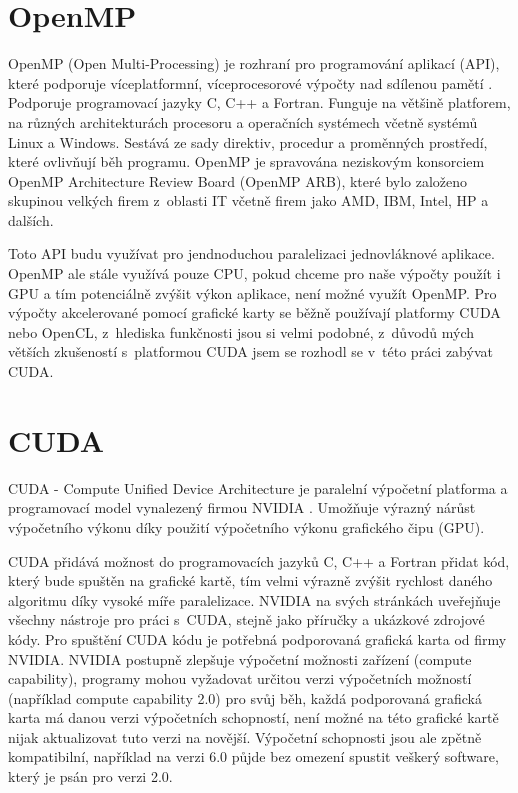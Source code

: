 \documentclass[thesis=M,czech]{FITthesis}[2016/06/26]
\begin{document}
\section{OpenMP}
OpenMP (Open Multi-Processing) je rozhraní pro programování aplikací (API), které podporuje víceplatformní, víceprocesorové výpočty nad sdílenou pamětí \cite{openmp}. Podporuje programovací jazyky C, C++ a Fortran. Funguje na většině platforem, na různých architekturách procesoru a operačních systémech včetně systémů Linux a Windows. Sestává ze sady direktiv, procedur a proměnných prostředí, které ovlivňují běh programu.
OpenMP je spravována neziskovým konsorciem OpenMP Architecture Review Board (OpenMP ARB), které bylo založeno skupinou velkých firem z~oblasti IT včetně firem jako AMD, IBM, Intel, HP a dalších.

Toto API budu využívat pro jendnoduchou paralelizaci jednovláknové aplikace. OpenMP ale stále využívá pouze CPU, pokud chceme pro naše výpočty použít i GPU a tím potenciálně zvýšit výkon aplikace, není možné využít OpenMP. Pro výpočty akcelerované pomocí grafické karty se běžně používají platformy CUDA nebo OpenCL, z~hlediska funkčnosti jsou si velmi podobné, z~důvodů mých větších zkušeností s~platformou CUDA jsem se rozhodl se v~této práci zabývat CUDA.
\section{CUDA}\label{CUDA}
CUDA - Compute Unified Device Architecture je paralelní výpočetní platforma a programovací model vynalezený firmou NVIDIA \cite{CUDA}. Umožňuje výrazný nárůst výpočetního výkonu díky použití výpočetního výkonu grafického čipu (GPU). 

CUDA přidává možnost do programovacích jazyků C, C++ a Fortran přidat kód, který bude spuštěn na grafické kartě, tím velmi výrazně zvýšit rychlost daného algoritmu díky vysoké míře paralelizace. NVIDIA na svých stránkách uveřejňuje všechny nástroje pro práci s~CUDA, stejně jako příručky a ukázkové zdrojové kódy. Pro spuštění CUDA kódu je potřebná podporovaná grafická karta od firmy NVIDIA. NVIDIA postupně zlepšuje výpočetní možnosti zařízení (compute capability), programy mohou vyžadovat určitou verzi výpočetních možností (například compute capability 2.0) pro svůj běh, každá podporovaná grafická karta má danou verzi výpočetních schopností, není možné na této grafické kartě nijak aktualizovat tuto verzi na novější. Výpočetní schopnosti jsou ale zpětně kompatibilní, například na verzi 6.0 půjde bez omezení spustit veškerý software, který je psán pro verzi 2.0.
\end{document}
